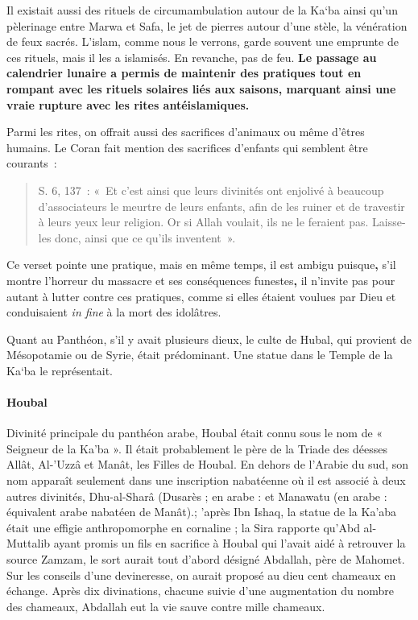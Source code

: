 Il existait aussi des rituels de circumambulation autour de la Ka`ba
ainsi qu'un pèlerinage entre Marwa et Safa, le jet de pierres autour
d'une stèle, la vénération de feux sacrés. L'islam, comme nous le
verrons, garde souvent une emprunte de ces rituels, mais il les a
islamisés. En revanche, pas de feu. \textbf{Le passage au calendrier
lunaire a permis de maintenir des pratiques tout en rompant avec les
rituels solaires liés aux saisons, marquant ainsi une vraie rupture avec
les rites antéislamiques.}

Parmi les rites, on offrait aussi des sacrifices d'animaux ou même
d'êtres humains. Le Coran fait mention des sacrifices d'enfants qui
semblent être courants~:
\begin{quote}
S. 6, 137~: «~Et c'est ainsi que leurs divinités ont enjolivé à beaucoup
d'associateurs le meurtre de leurs enfants, afin de les ruiner et de
travestir à leurs yeux leur religion. Or si Allah voulait, ils ne le
feraient pas. Laisse-les donc, ainsi que ce qu'ils inventent~».
    
\end{quote}

  Ce verset pointe une pratique, mais en même temps, il est ambigu
  puisque\textbf{,} s'il montre l'horreur du massacre et ses
  conséquences funestes\textbf{,} il n'invite pas pour autant à lutter
  contre ces pratiques, comme si elles étaient voulues par Dieu et
  conduisaient \emph{in fine} à la mort des idolâtres.

Quant au Panthéon, s'il y avait plusieurs dieux, le culte de Hubal, qui
provient de Mésopotamie ou de Syrie, était prédominant. Une statue dans le Temple
de la Ka`ba le représentait.


\paragraph{Houbal}{Divinité principale du panthéon arabe,
Houbal était connu sous le nom de « Seigneur de la Ka'ba ». Il était
probablement le père de la Triade des déesses Allât, Al-'Uzzâ et Manât,
les Filles de Houbal. En dehors de l'Arabie du sud, son nom apparaît
seulement dans une inscription nabatéenne où il est associé à deux
autres divinités, Dhu-al-Sharâ (Dusarès ; en arabe : et
Manawatu (en arabe : équivalent arabe nabatéen de Manât).;
'après Ibn Ishaq, la statue de la Ka'aba était une effigie
anthropomorphe en cornaline ; la Sira rapporte qu'Abd al-Muttalib ayant
promis un fils en sacrifice à Houbal qui l'avait aidé à retrouver la
source Zamzam, le sort aurait tout d'abord désigné Abdallah, père de
Mahomet. Sur les conseils d'une devineresse, on aurait proposé au dieu
cent chameaux en échange. Après dix divinations, chacune suivie d'une
augmentation du nombre des chameaux, Abdallah eut la vie sauve contre
mille chameaux.
}

